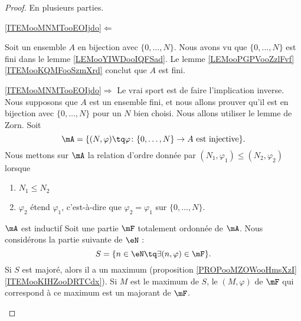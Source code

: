 \begin{proof}
    En plusieurs parties.
    \begin{subproof}
    \item[\ref{ITEMooMNMTooEOIjdo}\( \Leftarrow\)]
        
    Soit un ensemble \( A\) en bijection avec \( \{ 0,\ldots, N \}\). Nous avons vu que \( \{ 0,\ldots, N \}\) est fini dans le lemme \ref{LEMooYIWDooIQFSad}. Le lemme \ref{LEMooPGPVooZzlFvf}\ref{ITEMooKQMFooSzmXrd} conclut que \( A\) est fini.

    \item[\ref{ITEMooMNMTooEOIjdo}\( \Rightarrow\)]
    Le vrai sport est de faire l'implication inverse. Nous supposons que \( A\) est un ensemble fini, et nous allons prouver qu'il est en bijection avec \( \{ 0,\ldots, N \}\) pour un \( N\) bien choisi. Nous allons utiliser le lemme de Zorn. Soit
    \begin{equation}
        \mA=\{ (N,\varphi)\tq  \varphi\colon \{ 0,\ldots, N \}\to A\text{ est injective} \}.
    \end{equation}
    Nous mettons sur \( \mA\) la relation d'ordre donnée par \( (N_1,\varphi_1)\leq (N_2,\varphi_2)\) lorsque
    \begin{enumerate}
        \item
            \( N_1\leq N_2\)
        \item
            \( \varphi_2\) étend \( \varphi_1\), c'est-à-dire que \( \varphi_2=\varphi_1\) sur \( \{ 0,\ldots, N \}\).
    \end{enumerate}
    \begin{subproof}
    \item[\( \mA\) est inductif]
        Soit une partie \( \mF\) totalement ordonnée de \( \mA\). Nous considérons la partie suivante de \( \eN\) :
        \begin{equation}
            S=\{ n\in \eN\tq \exists (n,\varphi)\in \mF \}.
        \end{equation}
        Si \( S\) est majoré, alors il a un maximum (proposition \ref{PROPooMZOWooHmsXzI}\ref{ITEMooKIHZooDRTCdx}). Si \( M\) est le maximum de \( S\), le \( (M,\varphi)\) de \( \mF\) qui correspond à ce maximum est un majorant de \( \mF\).


\end{subproof}
\end{subproof}
\end{proof}
